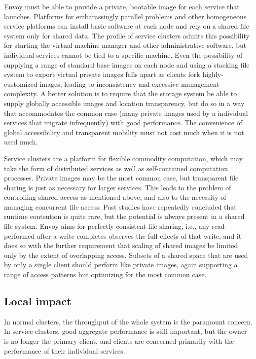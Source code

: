 Envoy must be able to provide a private, bootable image for each service that launches. Platforms for embarassingly parallel problems and other homogeneous service platforms can install basic software at each node and rely on a shared file system only for shared data. The profile of service clusters admits this possibility for starting the virtual machine manager and other administrative software, but individual services cannot be tied to a specific machine. Even the possibility of supplying a range of standard base images on each node and using a stacking file system to export virtual private images falls apart as clients fork highly-customized images, leading to inconsistency and excessive management complexity. A better solution is to require that the storage system be able to supply globally accessible images and location transparency, but do so in a way that accommodates the common case (many private images used by a individual services that migrate infrequently) with good performance. The convenience of global accessibility and transparent mobility must not cost much when it is not used much.

Service clusters are a platform for flexible commodity computation, which may take the form of distributed services as well as self-contained computation processes. Private images may be the most common case, but transparent file sharing is just as necessary for larger services. This leads to the problem of controlling shared access as mentioned above, and also to the necessity of managing concurrent file access. Past studies have repeatedly concluded that runtime contention is quite rare, but the potential is always present in a shared file system. Envoy aims for perfectly consistent file sharing, i.e., any read performed after a write completes observes the full effects of that write, and it does so with the further requirement that scaling of shared images be limited only by the extent of overlapping access. Subsets of a shared space that are used by only a single client should perform like private images, again supporting a range of access patterns but optimizing for the most common case.

\subsection{Local impact}

In normal clusters, the throughput of the whole system is the paramount concern. In service clusters, good aggregate performance is still important, but the owner is no longer the primary client, and clients are concerned primarily with the performance of their individual services.

